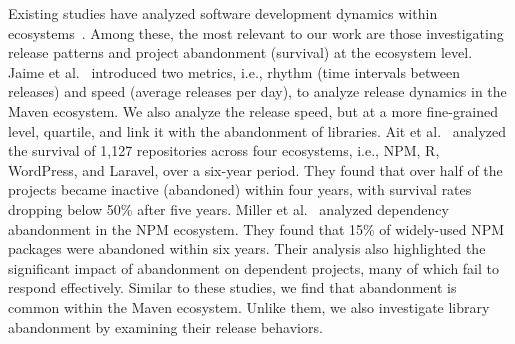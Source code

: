 
Existing studies have analyzed software development dynamics within ecosystems~\cite{german2013evolution,plakidas2017evolution,decan2019empirical,polese2022adoption}. Among these, the most relevant to our work are those investigating release patterns and project abandonment (survival) at the ecosystem level. Jaime et al.~\cite{jaime2022preliminary} introduced two metrics, i.e., rhythm (time intervals between releases) and speed (average releases per day), to analyze release dynamics in the Maven ecosystem. We also analyze the release speed, but at a more fine-grained level, quartile, and link it with the abandonment of libraries. Ait et al.~\cite{ait2022empirical} analyzed the survival of 1,127 repositories across four ecosystems, i.e., NPM, R, WordPress, and Laravel, over a six-year period. They found that over half of the projects became inactive (abandoned) within four years, with survival rates dropping below 50\% after five years. Miller et al.~\cite{miller2025understanding} analyzed dependency abandonment in the NPM ecosystem. They found that 15\% of widely-used NPM packages were abandoned within six years. Their analysis also highlighted the significant impact of abandonment on dependent projects, many of which fail to respond effectively. Similar to these studies, we find that abandonment is common within the Maven ecosystem. Unlike them, we also investigate library abandonment by examining their release behaviors.

